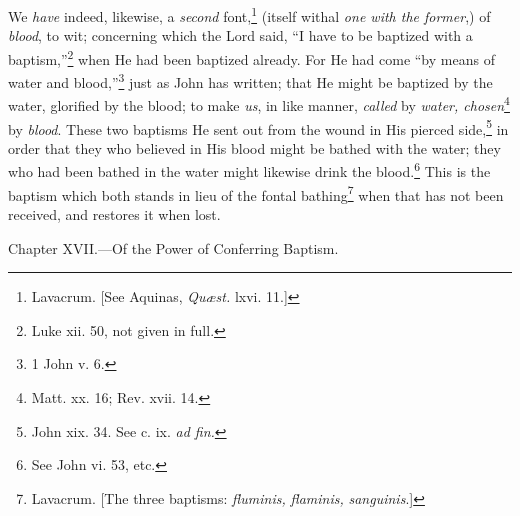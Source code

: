 We \emph{have} indeed, likewise, a \emph{second} font,\footnote{Lavacrum. [See Aquinas, \emph{Quæst.} lxvi. 11.]} (itself withal \emph{one with the former},) of \emph{blood}, to wit; concerning which the Lord said, “I have to be baptized with a baptism,”\footnote{Luke xii. 50, not given in full.} when He had been baptized already. For He had come “by means of water and blood,”\footnote{1 John v. 6.} just as John has written; that He might be baptized by the water, glorified by the blood; to make \emph{us}, in like manner, \emph{called} by \emph{water, chosen}\footnote{Matt. xx. 16; Rev. xvii. 14.} by \emph{blood}. These two baptisms He sent out from the wound in His pierced side,\footnote{John xix. 34. See c. ix. \emph{ad fin.}} in order that they who believed in His blood might be bathed with the water; they who had been bathed in the water might likewise drink the blood.\footnote{See John vi. 53, etc.} This is the baptism which both stands in lieu of the fontal bathing\footnote{Lavacrum. [The three baptisms: \emph{fluminis,} \emph{flaminis,} \emph{sanguinis}.]} when that has not been received, and restores it when lost.


Chapter XVII.—Of the Power of Conferring Baptism.

